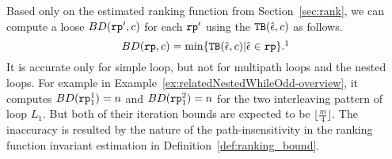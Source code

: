 Based only on the estimated ranking function from Section~\ref{sec:rank}, we can compute a loose $BD(\mathtt{rp}', c)$ for each $\mathtt{rp}'$
using the ${\mathtt{TB}}(\hat{\mathtt{\epsilon}{}}, c)$ as follows.
\begin{equation}
  \label{eq:absBD}
  BD(\rprog, c) = \min\left\{ \absclr(\absevent, c) \middle\vert \absevent \in \rprog \right\}.\footnotemark
\end{equation}
%
It is accurate only for simple loop, but not for multipath loops and the nested loops.
For example in Example~\ref{ex:relatedNestedWhileOdd-overview},
it computes $BD(\mathtt{rp}_1^1) = n$ and $BD(\mathtt{rp}_1^2) = n $ for the two interleaving pattern of loop $L_1$.
But both of their iteration bounds are expected to be $\lfloor\frac{m}{4}\rfloor$.
The inaccuracy is resulted by the nature of the path-insensitivity in the ranking function invariant estimation in Definition~\ref{def:ranking_bound}. 

